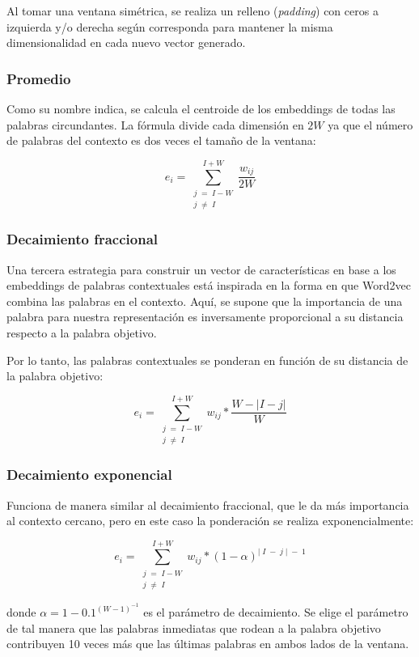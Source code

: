 Al tomar una ventana simétrica, se realiza un relleno (\textit{padding}) con ceros a izquierda y/o derecha según corresponda para mantener la misma dimensionalidad en cada nuevo vector generado.

\subsubsection{Promedio}

Como su nombre indica, se calcula el centroide de los embeddings de todas las palabras circundantes. La fórmula divide cada dimensión en $2W$ ya que el número de palabras del contexto es dos veces el tamaño de la ventana:

$$e_{i} =\sum_{\substack{j\;=\; I-W \\ j\;\neq\; I}}^{I + W} \frac{w_{ij}}{2W}$$

\subsubsection{Decaimiento fraccional}
Una tercera estrategia para construir un vector de características en base a los embeddings de palabras contextuales está inspirada en la forma en que Word2vec combina las palabras en el contexto. Aquí, se supone que la importancia de una palabra para nuestra representación es inversamente proporcional a su distancia respecto a la palabra objetivo.

Por lo tanto, las palabras contextuales se ponderan en función de su distancia de la palabra objetivo:

$$e_{i} =\sum_{\substack{j\;=\; I-W \\ j\;\neq\; I}}^{I + W} w_{ij} *\frac{W - \lvert I-j\rvert}{W}$$

\subsubsection{Decaimiento exponencial}
Funciona de manera similar al decaimiento fraccional, que le da más importancia al contexto cercano, pero en este caso la ponderación se realiza exponencialmente:

$$e_{i} =\sum_{\substack{j\;=\; I-W \\ j\;\neq\; I}}^{I + W} w_{ij} * (1 - \alpha)^{\lvert \; I\;-\; j\;\rvert\;-\;1}$$

donde $\alpha = 1 - 0.1^{(W-1)^{-1}}$ es el parámetro de decaimiento. Se elige el parámetro de tal manera que las palabras inmediatas que rodean a la palabra objetivo contribuyen 10 veces más que las últimas palabras en ambos lados de la ventana.

